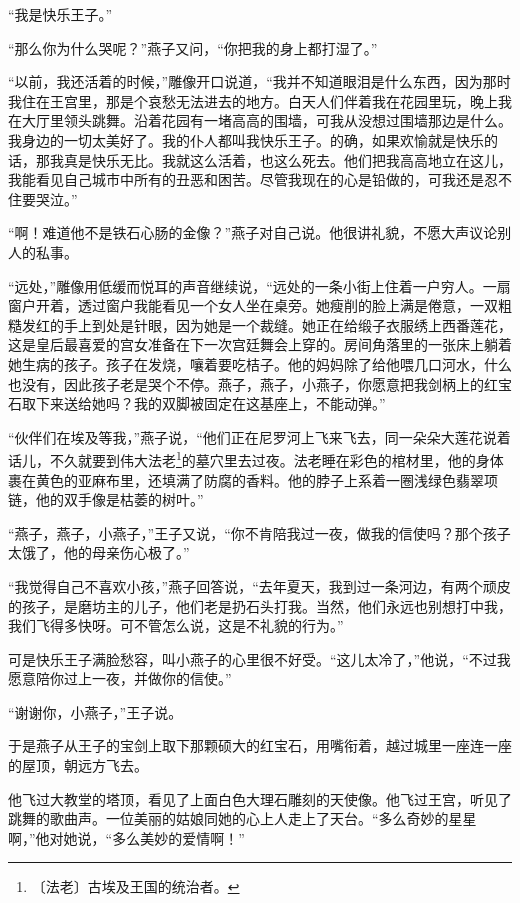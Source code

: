\documentclass[12pt,UTF-8,openany]{ctexbook}
\begin{document}
\begin{normalsize}
    “我是快乐王子。”
    
    “那么你为什么哭呢？”燕子又问，“你把我的身上都打湿了。”
    
    “以前，我还活着的时候，”雕像开口说道，“我并不知道眼泪是什么东西，因为那时我住在王宫里，那是个哀愁无法进去的地方。白天人们伴着我在花园里玩，晚上我在大厅里领头跳舞。沿着花园有一堵高高的围墙，可我从没想过围墙那边是什么。我身边的一切太美好了。我的仆人都叫我快乐王子。的确，如果欢愉就是快乐的话，那我真是快乐无比。我就这么活着，也这么死去。他们把我高高地立在这儿，我能看见自己城市中所有的丑恶和困苦。尽管我现在的心是铅做的，可我还是忍不住要哭泣。”
    
    “啊！难道他不是铁石心肠的金像？”燕子对自己说。他很讲礼貌，不愿大声议论别人的私事。
    
    “远处，”雕像用低缓而悦耳的声音继续说，“远处的一条小街上住着一户穷人。一扇窗户开着，透过窗户我能看见一个女人坐在桌旁。她瘦削的脸上满是倦意，一双粗糙发红的手上到处是针眼，因为她是一个裁缝。她正在给缎子衣服绣上西番莲花，这是皇后最喜爱的宫女准备在下一次宫廷舞会上穿的。房间角落里的一张床上躺着她生病的孩子。孩子在发烧，嚷着要吃桔子。他的妈妈除了给他喂几口河水，什么也没有，因此孩子老是哭个不停。燕子，燕子，小燕子，你愿意把我剑柄上的红宝石取下来送给她吗？我的双脚被固定在这基座上，不能动弹。”
    
    “伙伴们在埃及等我，”燕子说，“他们正在尼罗河上飞来飞去，同一朵朵大莲花说着话儿，不久就要到伟大法老\footnote{〔法老〕古埃及王国的统治者。}的墓穴里去过夜。法老睡在彩色的棺材里，他的身体裹在黄色的亚麻布里，还填满了防腐的香料。他的脖子上系着一圈浅绿色翡翠项链，他的双手像是枯萎的树叶。”
    
    “燕子，燕子，小燕子，”王子又说，“你不肯陪我过一夜，做我的信使吗？那个孩子太饿了，他的母亲伤心极了。”
    
    “我觉得自己不喜欢小孩，”燕子回答说，“去年夏天，我到过一条河边，有两个顽皮的孩子，是磨坊主的儿子，他们老是扔石头打我。当然，他们永远也别想打中我，我们飞得多快呀。可不管怎么说，这是不礼貌的行为。”
    
    可是快乐王子满脸愁容，叫小燕子的心里很不好受。“这儿太冷了，”他说，“不过我愿意陪你过上一夜，并做你的信使。”
    
    “谢谢你，小燕子，”王子说。
    
    于是燕子从王子的宝剑上取下那颗硕大的红宝石，用嘴衔着，越过城里一座连一座的屋顶，朝远方飞去。
    
    他飞过大教堂的塔顶，看见了上面白色大理石雕刻的天使像。他飞过王宫，听见了跳舞的歌曲声。一位美丽的姑娘同她的心上人走上了天台。“多么奇妙的星星啊，”他对她说，“多么美妙的爱情啊！”
    

\end{normalsize}
\end{document}
